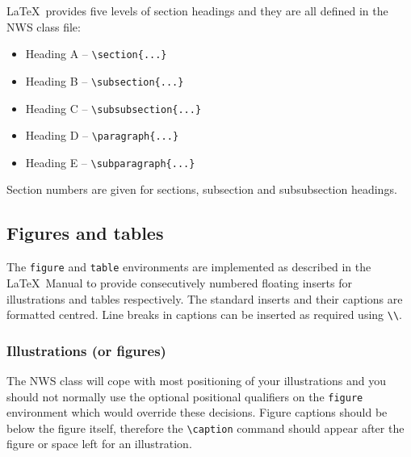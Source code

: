 \documentclass{article}
\begin{document}
\LaTeX\ provides five levels of section headings and they are all
defined in the NWS class file:
\begin{itemize}
  \item[] Heading A -- \verb"\section{...}"
  \item[] Heading B -- \verb"\subsection{...}"
  \item[] Heading C -- \verb"\subsubsection{...}"
  \item[] Heading D -- \verb"\paragraph{...}"
  \item[] Heading E -- \verb"\subparagraph{...}"
\end{itemize}
Section numbers are given for sections, subsection and subsubsection headings.

\subsection{Figures and tables}

The \texttt{figure} and \texttt{table} environments are implemented as described in
the \LaTeX\ Manual to
provide consecutively numbered floating inserts for illustrations and tables
respectively.
The standard inserts and their captions are formatted centred.
Line breaks in captions can be inserted as required using \verb"\\".

\subsubsection{Illustrations (or figures)}

The NWS class will cope with most positioning of your illustrations
and you should not normally use the optional positional qualifiers on
the \verb"figure" environment which would override these decisions.
Figure captions should be below the figure itself, therefore the
\verb"\caption" command should appear after the figure or space left
for an illustration.
\end{document}
